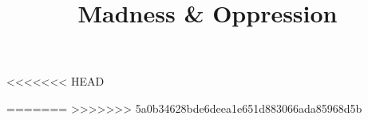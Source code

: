\documentclass[a4paper,12pt]{book}
\begin{document}
\author{}
\title{Madness \& Oppression}
\date{}

\frontmatter
\maketitle
\tableofcontents

\mainmatter



\backmatter



<<<<<<< HEAD


=======
>>>>>>> 5a0b34628bde6deea1e651d883066ada85968d5b
\end{document}
